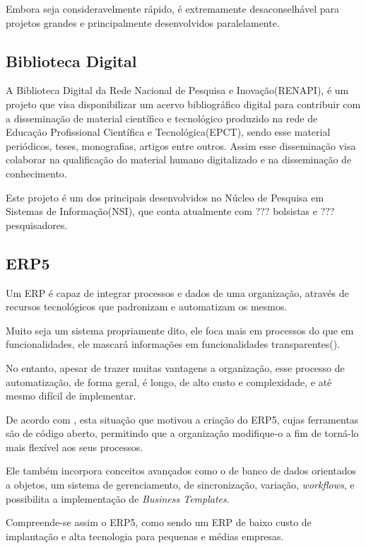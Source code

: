Embora seja consideravelmente rápido, é extremamente desaconselhável para projetos grandes e principalmente desenvolvidos paralelamente.

\subsection{Biblioteca Digital}

A Biblioteca Digital da Rede Nacional de Pesquisa e Inovação(RENAPI), é um projeto que visa disponibilizar um acervo bibliográfico digital para contribuir com a disseminação de material científico e tecnológico produzido na rede de Educação Profissional Científica e Tecnológica(EPCT), sendo esse material periódicos, teses, monografias, artigos entre outros. Assim esse disseminação visa colaborar na qualificação do material humano digitalizado e na disseminação de conhecimento.

Este projeto é um dos principais desenvolvidos no Núcleo de Pesquisa em Sistemas de Informação(NSI), que conta atualmente com ??? bolsistas e ??? pesquisadores.

\subsection{ERP5}

Um ERP é capaz de integrar processos e dados de uma organização, através de recursos tecnológicos que padronizam e automatizam os mesmos.

Muito seja um sistema propriamente dito, ele foca mais em processos do que em funcionalidades, ele mascará informações em funcionalidades transparentes(\cite{PITRE-DESAI}).

No entanto, apesar de trazer muitas vantagens a organização, esse processo de automatização, de forma geral, é longo, de alto custo e complexidade, e até mesmo difícil de implementar.

De acordo com \cite{SMETS-CARVALHO}, esta situação que motivou a criação do ERP5, cujas ferramentas são de código aberto, permitindo que a organização modifique-o a fim de torná-lo mais flexível aos seus processos.

Ele também incorpora conceitos avançados como o de banco de dados orientados a objetos, um sistema de gerenciamento, de sincronização, variação, \textit{workflows}, e possibilita a implementação de \textit{Business Templates}.

Compreende-se assim o ERP5, como sendo um ERP de baixo custo de implantação e alta tecnologia para pequenas e médias empresas.

